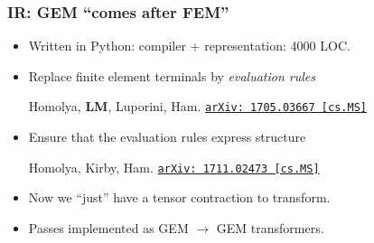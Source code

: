 \documentclass[presentation]{beamer}
\newcommand{\arxivlink}[2]{%
  \href{http://www.arxiv.org/abs/#1}%
  {\texttt{arXiv:\,#1\,[#2]}}%
}
\begin{document}
\begin{frame}
  \frametitle{IR: GEM ``comes after FEM''}
  \begin{itemize}
  \item Written in Python: compiler + representation: 4000 LOC.
  \item Replace finite element terminals by \emph{evaluation rules}
    \begin{flushright}
      {\footnotesize Homolya, \textbf{LM}, Luporini,
        Ham. \arxivlink{1705.03667}{cs.MS}}
    \end{flushright}
  \item Ensure that the evaluation rules express structure
    \begin{flushright}
      {\footnotesize Homolya, Kirby, Ham. \arxivlink{1711.02473}{cs.MS}}
    \end{flushright}
    
  \item Now we ``just'' have a tensor contraction to transform.
  \item Passes implemented as GEM $\to$ GEM transformers.
  \end{itemize}
\end{frame}
\end{document}
